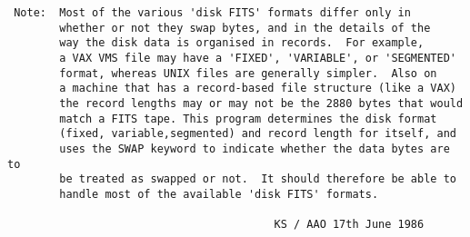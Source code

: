 \begin{description}
\begin{verbatim}
 Note:  Most of the various 'disk FITS' formats differ only in
        whether or not they swap bytes, and in the details of the
        way the disk data is organised in records.  For example,
        a VAX VMS file may have a 'FIXED', 'VARIABLE', or 'SEGMENTED'
        format, whereas UNIX files are generally simpler.  Also on
        a machine that has a record-based file structure (like a VAX)
        the record lengths may or may not be the 2880 bytes that would
        match a FITS tape. This program determines the disk format
        (fixed, variable,segmented) and record length for itself, and
        uses the SWAP keyword to indicate whether the data bytes are to
        be treated as swapped or not.  It should therefore be able to
        handle most of the available 'disk FITS' formats.

                                         KS / AAO 17th June 1986
\end{verbatim}
\end{description}
